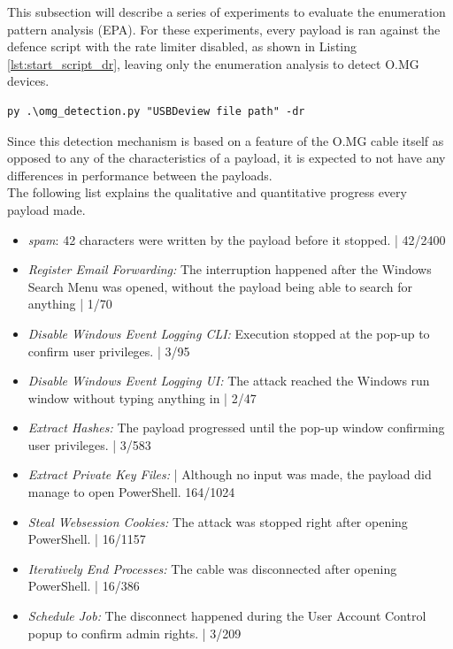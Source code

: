 This subsection will describe a series of experiments to evaluate the enumeration pattern analysis (EPA). For these experiments, every payload is ran against the defence script with the rate limiter disabled, as shown in Listing \ref{lst:start_script_dr}, leaving only the enumeration analysis to detect O.MG devices.

\begin{lstlisting}[caption={Start defence Script with Rate Limiter disabled},label={lst:start_script_dr}, captionpos=b]
 py .\omg_detection.py "USBDeview file path" -dr
\end{lstlisting}

Since this detection mechanism is based on a feature of the O.MG cable itself as opposed to any of the characteristics of a payload, it is expected to not have any differences in performance between the payloads. \\
The following list explains the qualitative and quantitative progress every payload made.

\begin{itemize}
    \item  \emph{spam}: 42 characters were written by the payload before it stopped. | 42/2400
    \item  \emph{Register Email Forwarding:} The interruption happened after the Windows Search Menu was opened, without the payload being able to search for anything  |  1/70 
    \item  \emph{Disable Windows Event Logging CLI:}  Execution stopped at the pop-up to confirm user privileges. | 3/95
    \item  \emph{Disable Windows Event Logging UI:} The attack reached the Windows run window without typing anything in | 2/47
    \item  \emph{Extract Hashes:}  The payload progressed until the pop-up window confirming user privileges. | 3/583
    \item  \emph{Extract Private Key Files:}  | Although no input was made, the payload did manage to open PowerShell. 164/1024
    \item  \emph{Steal Websession Cookies:} The attack was stopped right after opening PowerShell. | 16/1157
    \item  \emph{Iteratively End Processes:} The cable was disconnected after opening PowerShell. | 16/386
    \item  \emph{Schedule Job:} The disconnect happened during the User Account Control popup to confirm admin rights. | 3/209
\end{itemize}

